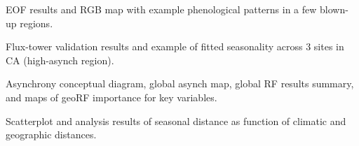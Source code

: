 \documentclass[12pt]{article}
\begin{document}
\clearpage

 EOF results and RGB map with example phenological patterns in a few blown-up regions.

 Flux-tower validation results and example of fitted seasonality across 3 sites in CA (high-asynch region).

 Asynchrony conceptual diagram, global asynch map, global RF results summary, and maps of geoRF importance for key variables.

 Scatterplot and analysis results of seasonal distance as function of climatic and geographic distances.
\end{document}
